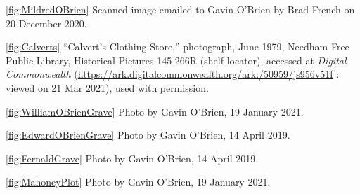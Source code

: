 \ref{fig:MildredOBrien} Scanned image emailed to Gavin O'Brien by Brad French on 20 December 2020.

\ref{fig:Calverts} ``Calvert's Clothing Store,'' photograph, June 1979, Needham Free Public Library, Historical Pictures 145-266R (shelf locator), accessed at \textit{Digital Commonwealth} (\url{https://ark.digitalcommonwealth.org/ark:/50959/js956v51f} : viewed on 21 Mar 2021), used with permission.

\ref{fig:WilliamOBrienGrave} Photo by Gavin O'Brien, 19 January 2021.

\ref{fig:EdwardOBrienGrave} Photo by Gavin O'Brien, 14 April 2019.

\ref{fig:FernaldGrave} Photo by Gavin O'Brien, 14 April 2019.

\ref{fig:MahoneyPlot} Photo by Gavin O'Brien, 19 January 2021.